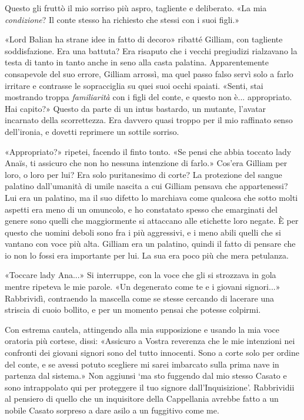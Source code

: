 Questo gli fruttò il mio sorriso più aspro, tagliente e deliberato. «La
mia \emph{condizione}? Il conte stesso ha richiesto che stessi con i
suoi figli.»

«Lord Balian ha strane idee in fatto di decoro» ribatté Gilliam, con
tagliente soddisfazione. Era una battuta? Era risaputo che i vecchi
pregiudizi rialzavano la testa di tanto in tanto anche in seno alla
casta palatina. Apparentemente consapevole del suo errore, Gilliam
arrossì, ma quel passo falso servì solo a farlo irritare e contrasse le
sopracciglia su quei suoi occhi spaiati. «Senti, stai mostrando troppa
\emph{familiarità} con i figli del conte, e questo non è... appropriato.
Hai capito?» Questo da parte di un intus bastardo, un mutante, l'avatar
incarnato della scorrettezza. Era davvero quasi troppo per il mio
raffinato senso dell'ironia, e dovetti reprimere un sottile sorriso.

«Appropriato?» ripetei, facendo il finto tonto. «Se pensi che abbia
toccato lady Anaïs, ti assicuro che non ho nessuna intenzione di farlo.»
Cos'era Gilliam per loro, o loro per lui? Era solo puritanesimo di
corte? La protezione del sangue palatino dall'umanità di umile nascita a
cui Gilliam pensava che appartenessi? Lui era un palatino, ma il suo
difetto lo marchiava come qualcosa che sotto molti aspetti era meno di
un omuncolo, e ho constatato spesso che emarginati del genere sono
quelli che maggiormente si attaccano alle etichette loro negate. È per
questo che uomini deboli sono fra i più aggressivi, e i meno abili
quelli che si vantano con voce più alta. Gilliam era un palatino, quindi
il fatto di pensare che io non lo fossi era importante per lui. La sua
era poco più che mera petulanza.

«Toccare lady Ana...» Si interruppe, con la voce che gli si strozzava in
gola mentre ripeteva le mie parole. «Un degenerato come te e i giovani
signori...» Rabbrividì, contraendo la mascella come se stesse cercando
di lacerare una striscia di cuoio bollito, e per un momento pensai che
potesse colpirmi.

Con estrema cautela, attingendo alla mia supposizione e usando la mia
voce oratoria più cortese, dissi: «Assicuro a Vostra reverenza che le
mie intenzioni nei confronti dei giovani signori sono del tutto
innocenti. Sono a corte solo per ordine del conte, e se avessi potuto
scegliere mi sarei imbarcato sulla prima nave in partenza dal sistema.»
Non aggiunsi `ma sto fuggendo dal mio stesso Casato e sono intrappolato
qui per proteggere il tuo signore dall'Inquisizione'. Rabbrividii al
pensiero di quello che un inquisitore della Cappellania avrebbe fatto a
un nobile Casato sorpreso a dare asilo a un fuggitivo come me.

